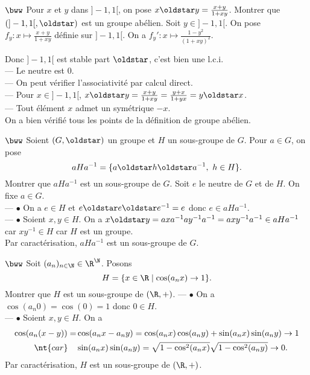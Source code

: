 \documentclass[11pt]{article}
\begin{document}
\begin{exercice}{$\bww$}{}
    Pour $x$ et $y$ dans $]-1,1[$, on pose $x\s y=\frac{x+y}{1+xy}$. Montrer que $(]-1,1[,\s)$ est un groupe abélien.
    \tcblower
    Soit $y\in]-1,1[$. On pose $f_y:x\mapsto\frac{x+y}{1+xy}$ définie sur $]-1,1[$. On a $f_y':x\mapsto\frac{1-y^2}{(1+xy)^2}$.
    \begin{center}
    \end{center}
    Donc $]-1,1[$ est stable part $\s$, c'est bien une l.c.i.\\
    --- Le neutre est 0.\\
    --- On peut vérifier l'associativité par calcul direct.\\
    --- Pour $x\in]-1,1[$, $x\s y = \frac{x+y}{1+xy}=\frac{y+x}{1+yx}=y\s x$.\\
    --- Tout élément $x$ admet un symétrique $-x$.\\
    On a bien vérifié tous les points de la définition de groupe abélien.
\end{exercice}

\begin{exercice}{$\bww$}{}
    Soient $(G,\s)$ un groupe et $H$ un sous-groupe de $G$. Pour $a\in G$, on pose
    \begin{equation*}
        aHa^{-1}=\{a\s h\s a^{-1}, ~ h \in H\}.
    \end{equation*}
    Montrer que $aHa^{-1}$ est un sous-groupe de $G$.
    \tcblower
    Soit $e$ le neutre de $G$ et de $H$. On fixe $a\in G$.\\
    --- $\bullet$ On a $e\in H$ et $e\s e \s e^{-1}=e$ donc $e\in aHa^{-1}$.\\
    --- $\bullet$ Soient $x,y\in H$. On a $x\s y = axa^{-1}ay^{-1}a^{-1}=axy^{-1}a^{-1}\in aHa^{-1}$ car $xy^{-1}\in H$ car $H$ est un groupe.\\
    Par caractérisation, $aHa^{-1}$ est un sous-groupe de $G$.
\end{exercice}

\pagebreak

\begin{exercice}{$\bww$}{}
    Soit $(a_n)_{n\in\N}\in\R^\N$. Posons
    \begin{equation*}
        H=\{x\in\R \mid \cos(a_nx)\to1\}.
    \end{equation*}
    Montrer que $H$ est un sous-groupe de $(\R,+)$.
    \tcblower
    --- $\bullet$ On a $\cos(a_n0)=\cos(0)=1$ donc $0\in H$.\\
    --- $\bullet$ Soient $x,y\in H$. On a \begin{align*}
        \cos(a_n(x-y))=&\cos(a_nx - a_ny)=\cos(a_nx)\cos(a_ny)+\sin(a_nx)\sin(a_ny)\to1\\
        \nt{car}\quad&\sin(a_nx)\sin(a_ny)=\sqrt{1-\cos^2(a_nx)}\sqrt{1-\cos^2(a_ny)}\to0.
    \end{align*}
    Par caractérisation, $H$ est un sous-groupe de $(\R,+)$.
\end{exercice}
\end{document}
